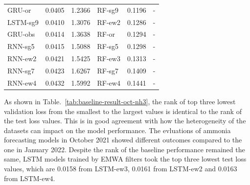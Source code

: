 \begin{table}[!ht]
\begin{NiceTabular}{lcclcc}
      GRU-or   & 0.0405 &1.2366&RF-sg9  & 0.1196&- \\
      LSTM-sg9 & 0.0410 &1.3076&RF-ew2  & 0.1286&- \\
      GRU-obs  & 0.0414 &1.3638&RF-or   & 0.1294&- \\
      RNN-sg5  & 0.0415 &1.5088&RF-sg5  & 0.1298&- \\
      RNN-ew2  & 0.0421 &1.5425&RF-ew3  & 0.1313&- \\
      RNN-sg7  & 0.0423 &1.6267&RF-sg7  & 0.1409&- \\
      RNN-ew4  & 0.0432 &1.5992&RF-ew4  & 0.1441&- \\
      \bottomrule
  \end{NiceTabular}
\end{table}

As shown in Table.~\ref{tab:baseline-result-oct-nh3}, the rank of top three lowest validation loss from the smallest to the largest values is identical to the rank of the test loss values. This is in good agreement with how the heterogeneity of the datasets can impact on the model performance. The evluations of ammonia forecasting models in October 2021 showed different outcomes compared to the one in January 2022. Despite the rank of the baseline performance remained the same, LSTM models trained by EMWA filters took the top three lowest test loss values, which are 0.0158 from LSTM-ew3, 0.0161 from LSTM-ew2 and 0.0163 from LSTM-ew4. 

